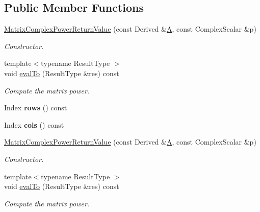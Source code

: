 \subsection*{Public Member Functions}
\begin{DoxyCompactItemize}
\item 
\hyperlink{class_eigen_1_1_matrix_complex_power_return_value_a3e5903e22f70e9deb07c3967ae52fd54}{Matrix\+Complex\+Power\+Return\+Value} (const Derived \&\hyperlink{group___core___module_class_eigen_1_1_matrix}{A}, const Complex\+Scalar \&p)
\begin{DoxyCompactList}\small\item\em Constructor. \end{DoxyCompactList}\item 
{\footnotesize template$<$typename Result\+Type $>$ }\\void \hyperlink{class_eigen_1_1_matrix_complex_power_return_value_aac9c4065d4711e62af085633a38c4416}{eval\+To} (Result\+Type \&res) const
\begin{DoxyCompactList}\small\item\em Compute the matrix power. \end{DoxyCompactList}\item 
\mbox{\label{class_eigen_1_1_matrix_complex_power_return_value_ad64216fcb7130adeccb5301054c0b8fc}} 
Index {\bfseries rows} () const
\item 
\mbox{\label{class_eigen_1_1_matrix_complex_power_return_value_a41bccc801f588f3312b002ee4b03833e}} 
Index {\bfseries cols} () const
\item 
\hyperlink{class_eigen_1_1_matrix_complex_power_return_value_a3e5903e22f70e9deb07c3967ae52fd54}{Matrix\+Complex\+Power\+Return\+Value} (const Derived \&\hyperlink{group___core___module_class_eigen_1_1_matrix}{A}, const Complex\+Scalar \&p)
\begin{DoxyCompactList}\small\item\em Constructor. \end{DoxyCompactList}\item 
{\footnotesize template$<$typename Result\+Type $>$ }\\void \hyperlink{class_eigen_1_1_matrix_complex_power_return_value_aac9c4065d4711e62af085633a38c4416}{eval\+To} (Result\+Type \&res) const
\begin{DoxyCompactList}\small\item\em Compute the matrix power. \end{DoxyCompactList}\item 

\end{DoxyCompactItemize}
